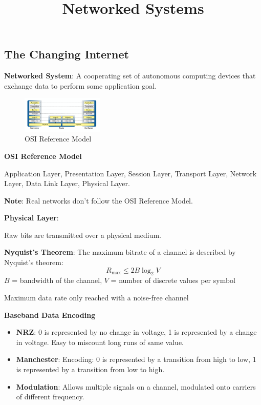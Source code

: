 \documentclass{article}
\title{Networked Systems}
\author{}
\date{}
\begin{document}

\subsection*{The Changing Internet}

\textbf{Networked System}: A cooperating set of autonomous computing devices that exchange data to perform some application goal.

\begin{figure}[h]
    \centering
    \includegraphics[width=0.35\textwidth]{assets/osi-model.png}
    \caption{OSI Reference Model}\label{fig:osi-model}
\end{figure}

\textbf{OSI Reference Model}

Application Layer, Presentation Layer, Session Layer, Transport Layer, Network Layer, Data Link Layer, Physical Layer.

\textbf{Note}: Real networks don't follow the OSI Reference Model.

\vspace{\baselineskip}

\textbf{Physical Layer}:

Raw bits are transmitted over a physical medium.

\textbf{Nyquist's Theorem}: The maximum bitrate of a channel is described by Nyquist's theorem:
\[
R_{\max} \leq 2B \log_2 V
\]
$B$ = bandwidth of the channel,
$V$ = number of discrete values per symbol

Maximum data rate only reached with a noise-free channel

\textbf{Baseband Data Encoding}
\begin{itemize}
    \item \textbf{NRZ}: 0 is represented by no change in voltage, 1 is represented by a change in voltage. Easy to miscount long runs of same value.
    \item \textbf{Manchester}: Encoding: 0 is represented by a transition from high to low, 1 is represented by a transition from low to high.
    \item \textbf{Modulation}: Allows multiple signals on a channel, modulated onto carriers of different frequency.
\end{itemize}
\end{document}
